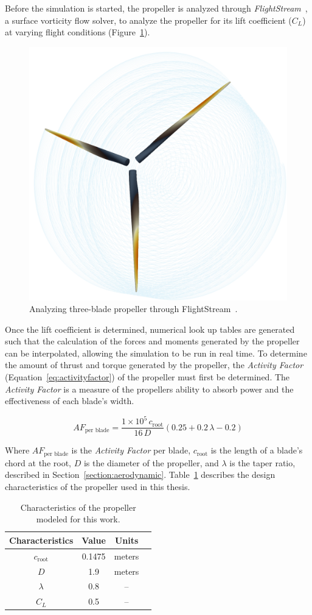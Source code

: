 Before the simulation is started, the propeller is analyzed through \textit{FlightStream}~\cite{FlightStream2022}, a surface vorticity flow solver, to analyze the propeller for its lift coefficient (\(C_L\)) at varying flight conditions (Figure~\ref{fig:flightstreamprop}).

\begin{figure}[!ht]\label{fig:flightstreamprop}
    \centering
    \includegraphics[width=.35\linewidth]{Figures/flightstreamprop.png}
    \caption{Analyzing three-blade propeller through FlightStream~\cite{FlightStream2022}.}
\end{figure}

Once the lift coefficient is determined, numerical look up tables are generated such that the calculation of the forces and moments generated by the propeller can be interpolated, allowing the simulation to be run in real time. To determine the amount of thrust and torque generated by the propeller, the \textit{Activity Factor} (Equation~\ref{eq:activityfactor}) of the propeller must first be determined. The \textit{Activity Factor} is a measure of the propellers ability to absorb power and the effectiveness of each blade's width.

\begin{equation}\label{eq:activityfactor}
    AF_{\textrm{per blade}} = \frac{1 \times 10^5 \, c_{\textrm{root}}}{16 \, D} \left(0.25 + 0.2 \, \lambda - 0.2 \right)
\end{equation}

Where \(AF_{\textrm{per blade}}\) is the \textit{Activity Factor} per blade, \(c_{\textrm{root}}\) is the length of a blade's chord at the root, \(D\) is the diameter of the propeller, and \( \lambda \) is the taper ratio, described in Section~\ref{section:aerodynamic}. Table~\ref{tbl:propparams} describes the design characteristics of the propeller used in this thesis.

\begin{table}[!ht]\label{tbl:propparams}
    \caption{Characteristics of the propeller modeled for this work.}
    \centering
    \begin{tabular}{cccc}
        \toprule
        \textbf{Characteristics }      & \textbf{Value}  & \textbf{Units}  \\
        \midrule
        \(c_{\textrm{root}}\) & 0.1475 & meters \\
        \(D\)                 & 1.9    & meters \\
        \( \lambda \)         & 0.8    & {--}    \\
        \(C_L\)               & 0.5    & {--}    \\
        \bottomrule
    \end{tabular}
\end{table}

